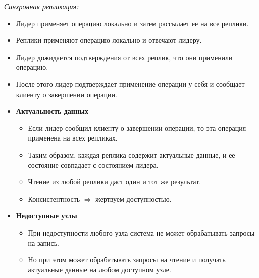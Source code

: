 \begin{definition}
    \textit{Синхронная репликация:}
    \begin{itemize}
        \item Лидер применяет операцию локально и затем рассылает ее на все реплики.
        \item Реплики применяют операцию локально и отвечают лидеру.
        \item Лидер дожидается подтверждения от всех реплик, что они применили операцию.
        \item После этого лидер подтверждает применение операции у себя и сообщает клиенту о завершении операции.

        \item \textbf{Актуальность данных}
        \begin{itemize}
            \item Если лидер сообщил клиенту о завершении операции, то эта операция применена на всех репликах.
            \item Таким образом, каждая реплика содержит актуальные данные, и ее состояние совпадает с состоянием лидера.
            \item Чтение из любой реплики даст один и тот же результат.
            \item Консистентность $\Rightarrow$ жертвуем доступностью.
        \end{itemize}

        \item \textbf{Недоступные узлы}
        \begin{itemize}
            \item При недоступности любого узла система не может обрабатывать запросы на запись.
            \item Но при этом может обрабатывать запросы на чтение и получать актуальные данные на любом доступном узле.
        \end{itemize}

    \end{itemize}
\end{definition}

\newpage

